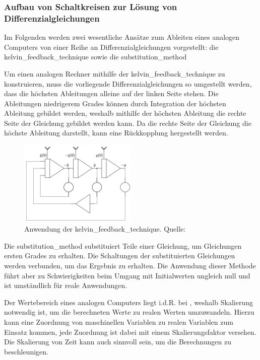 \subsubsection{Aufbau von Schaltkreisen zur Lösung von Differenzialgleichungen}

Im Folgenden werden zwei wesentliche Ansätze zum Ableiten eines analogen Computers von einer Reihe an Differenzialgleichungen vorgestellt: die \gls{kelvin_feedback_technique} sowie die \gls{substitution_method}

Um einen analogen Rechner mithilfe der \gls{kelvin_feedback_technique} zu konstruieren, muss die vorliegende Differenzialgleichungen so umgestellt werden, dass die höchsten Ableitungen alleine auf der linken Seite stehen. Die Ableitungen niedrigerem Grades können durch Integration der höchsten Ableitung gebildet werden, weshalb mithilfe der höchsten Ableitung die rechte Seite der Gleichung gebildet werden kann. Da die rechte Seite der Gleichung die höchste Ableitung darstellt, kann eine Rückkopplung hergestellt werden. \cite[vgl. S. 153 ff.]{Ulmann2022}

\begin{figure}[h]
  \includegraphics[width=0.5\textwidth]{abbildungen/kelvin_feedback_technik.png}
  \caption{Anwendung der \gls{kelvin_feedback_technique}. Quelle: \cite[S. 154]{Ulmann2022}}
  \label{fig:Kelvin Feedback Technik}
\end{figure}

Die \gls{substitution_method} substituiert Teile einer Gleichung, um Gleichungen ersten Grades zu erhalten. Die Schaltungen der substituierten Gleichungen werden verbunden, um das Ergebnis zu erhalten. Die Anwendung dieser Methode führt aber zu Schwierigkeiten beim Umgang mit Initialwerten ungleich null und ist umständlich für reale Anwendungen. \cite[vgl. S. 155 ff.]{Ulmann2022}

Der Wertebereich eines analogen Computers liegt i.d.R. bei , weshalb Skalierung notwendig ist, um die berechneten Werte zu realen Werten umzuwandeln. Hierzu kann eine Zuordnung von maschinellen Variablen zu realen Variablen zum Einsatz kommen, jede Zuordnung ist dabei mit einem Skalierungsfaktor versehen. Die Skalierung von Zeit kann auch sinnvoll sein, um die Berechnungen zu beschleunigen. \cite[vgl. S. 162 ff.]{Ulmann2022}

